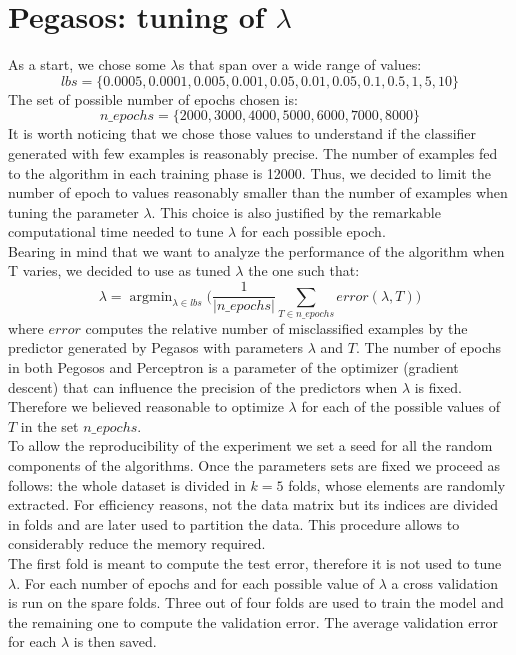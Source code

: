 \documentclass{article}
\DeclareMathOperator*{\argmin}{argmin}
\begin{document}
\section{Pegasos: tuning of $\lambda$} \label{Pegasos tuning}
As a start, we chose some $\lambda$s that span over a wide range of values: $$lbs = \{0.0005, 0.0001, 0.005, 0.001, 0.05, 0.01, 0.05, 0.1, 0.5, 1, 5, 10\}$$The set of possible number of epochs chosen is: $$n\_epochs = \{2000, 3000, 4000, 5000, 6000, 7000, 8000\}$$ It is worth noticing that we chose those values to understand if the classifier generated with few examples is reasonably precise. The number of examples fed to the algorithm in each training phase is 12000. Thus, we decided to limit the number of epoch to values reasonably smaller than the number of examples when tuning the parameter $\lambda$. This choice is also justified by the remarkable computational time needed to tune $\lambda$ for each possible epoch.
\\
Bearing in mind that we want to analyze the performance of the algorithm when T varies, we decided to use as tuned $\lambda$ the one such that:
\begin{equation}
    \lambda = \argmin_{\lambda \in lbs} \bigg(\frac{1}{|n\_epochs|} \sum_{T \in n\_epochs} error(\lambda,T) \bigg)
\end{equation}
where $error$ computes the relative number of misclassified examples by the predictor generated by Pegasos with parameters $\lambda$ and $T$.
The number of epochs in both Pegosos and Perceptron is a parameter of the optimizer (gradient descent) that can influence the precision of the predictors when $\lambda$ is fixed. Therefore we believed reasonable to optimize $\lambda$ for each of the possible values of $T$ in the set $n\_epochs$.\\
To allow the reproducibility of the experiment we set a seed for all the random components of the algorithms. Once the parameters sets are fixed we proceed as follows: the whole dataset is divided in $k=5$ folds, whose elements are randomly extracted. For efficiency reasons, not the data matrix but its indices are divided in folds and are later used to partition the data. This procedure allows to considerably reduce the memory required. \\
The first fold is meant to compute the test error, therefore it is not used to tune $\lambda$. For each number of epochs and for each possible value of $\lambda$ a cross validation is run on the spare folds. Three out of four folds are used to train the model and the remaining one to compute the validation error. The average validation error for each $\lambda$ is then saved.
\end{document}
